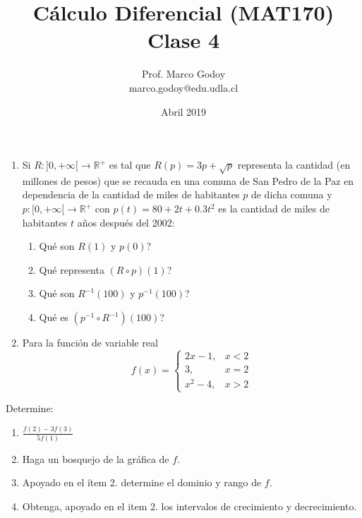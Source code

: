 \documentclass[10pt]{article}
\title{C\'alculo Diferencial (MAT170)\\ Clase 4 }
\author{Prof. Marco Godoy\\
marco.godoy@edu.udla.cl}
\date{Abril 2019}
\newcommand{\2}[1]{\hspace{-0.93cm}\colorbox{color1}{\hspace{0.07cm} \parbox{17cm}{\vspace{0.2cm} #1}\hspace*{0.07cm} }}
\newcommand{\3}[1]{\hspace{-0.93cm}\colorbox{color7}{\hspace{0.07cm} \parbox{17cm}{\vspace{0.2cm} #1}\hspace*{0.07cm} }}
\theoremstyle{theorem}
\numberwithin{equation}{section}
\newcommand{\dis}{\displaystyle}
\begin{document}
\maketitle

\begin{enumerate}[P1.]
    \item Si $R:]0,+\infty[\to \mathbb{R}^{+}$ es tal que $R(p)=3p+\sqrt{p}$ representa la cantidad (en millones de pesos) que se recauda en una comuna de San Pedro de la Paz en dependencia de la cantidad de miles de habitantes $p$ de dicha comuna y $p: [0,+\infty[\to \mathbb{R}^+$ con $p(t)=80+2t+0.3t^2$ es la cantidad de miles de habitantes $t$ a\~nos despu\'es del 2002:
    \begin{enumerate}[1.]
    \item Qu\'e son $R(1)$ y $p(0)$?
    \item Qu\'e representa $(R\circ p)(1)$?
    \item Qu\'e son $R^{-1}(100)$ y $p^{-1}(100)$?
    \item Qu\'e es $(p^{-1}\circ R^{-1})(100)$?
    
    \end{enumerate}
    \item Para la funci\'on de variable real $$f(x)=\left\lbrace \begin{array}{lc}
    2x-1, &x<2 \\ 3,&x=2 \\x^2-4,&x>2
    \end{array}\right.$$
\end{enumerate} Determine:
    \begin{enumerate}[1.]
    \item $\dis \frac{f(2)-3f(3)}{5f(1)}$
    \item Haga un bosquejo de la gr\'afica de $f$.
    \item Apoyado en el \'item 2. determine el dominio y rango de $f$.
    \item Obtenga, apoyado en el item $2.$ los intervalos de crecimiento y decrecimiento.
    \end{enumerate}
\end{document}
